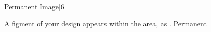 \begin{spellsection}{Permanent Image}[6]
    \begin{spellheader}
    \end{spellheader}
    \begin{spellcontent}
        \begin{spelltargetinginfo}
        \end{spelltargetinginfo}
        \begin{spelleffects}

            \spellline
            \spelleffect A figment of your design appears within the area, as .
            \spelldur Permanent \dismissable
        \end{spelleffects}
    \end{spellcontent}
    \begin{spellfooter}
    \end{spellfooter}
\end{spellsection}

